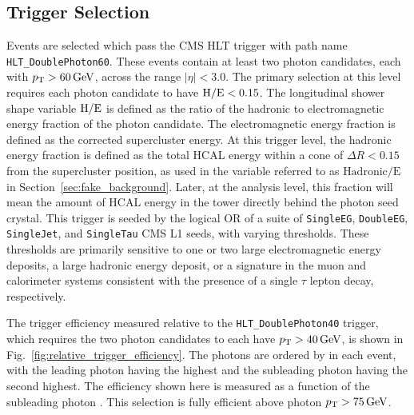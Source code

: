 \subsection{Trigger Selection}\label{sec:trigger}

Events are selected which pass the CMS HLT trigger with path name \texttt{HLT\_DoublePhoton60}. These events contain at least two photon candidates, each with $p_{\mathrm{T}}>60\,\text{Ge\hspace{-.08em}V}$, across the range $|\eta| < 3.0$. The primary selection at this level requires each photon candidate to have $\mathrm{H/E} < 0.15$. The longitudinal shower shape variable $\mathrm{H/E}$ is defined as the ratio of the hadronic to electromagnetic energy fraction of the photon candidate. The electromagnetic energy fraction is defined as the corrected supercluster energy. At this trigger level, the hadronic energy fraction is defined as the total HCAL energy within a cone of $\Delta R < 0.15$ from the supercluster position, as used in the variable referred to as $\text{Hadronic/E}$ in Section~\ref{sec:fake_background}. Later, at the analysis level, this fraction will mean the amount of HCAL energy in the tower directly behind the photon seed crystal. This trigger is seeded by the logical OR of a suite of \texttt{SingleEG}, \texttt{DoubleEG}, \texttt{SingleJet}, and \texttt{SingleTau} CMS L1 seeds, with varying thresholds. These thresholds are primarily sensitive to one or two large electromagnetic energy deposits, a large hadronic energy deposit, or a signature in the muon and calorimeter systems consistent with the presence of a single $\tau$ lepton decay, respectively.

The trigger efficiency measured relative to the \texttt{HLT\_DoublePhoton40} trigger, which requires the two photon candidates to each have $p_{\mathrm{T}}>40\,\text{Ge\hspace{-.08em}V}$, is shown in Fig.~\ref{fig:relative_trigger_efficiency}. The photons are ordered by \pt in each event, with the leading photon having the highest \pt and the subleading photon having the second highest. The efficiency shown here is measured as a function of the subleading photon \pt. This selection is fully efficient above photon $p_{\mathrm{T}} > 75\,\text{Ge\hspace{-.08em}V}$.

